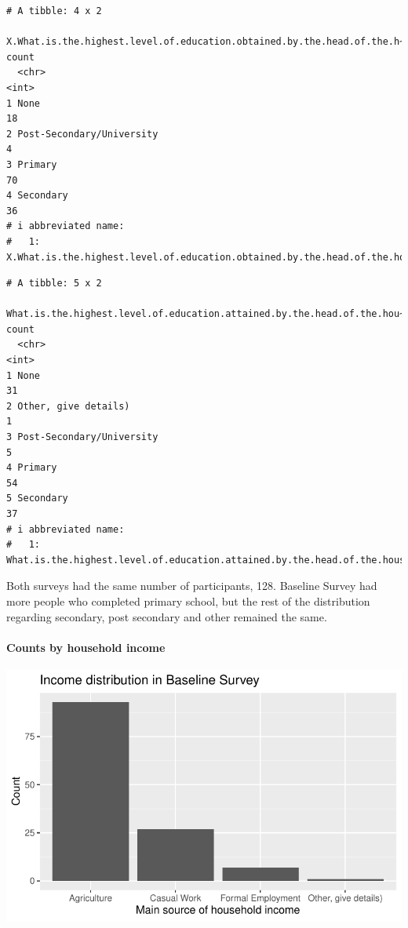 \documentclass[
  letterpaper,
  DIV=11,
  numbers=noendperiod]{scrartcl}
\let\oldparagraph\paragraph
\renewcommand{\paragraph}[1]{\oldparagraph{#1}\mbox{}}
\begin{document}
\begin{verbatim}
# A tibble: 4 x 2
  X.What.is.the.highest.level.of.education.obtained.by.the.head.of.the.h~1 count
  <chr>                                                                    <int>
1 None                                                                        18
2 Post-Secondary/University                                                    4
3 Primary                                                                     70
4 Secondary                                                                   36
# i abbreviated name:
#   1: X.What.is.the.highest.level.of.education.obtained.by.the.head.of.the.household.
\end{verbatim}

\begin{verbatim}
# A tibble: 5 x 2
  What.is.the.highest.level.of.education.attained.by.the.head.of.the.hou~1 count
  <chr>                                                                    <int>
1 None                                                                        31
2 Other, give details)                                                         1
3 Post-Secondary/University                                                    5
4 Primary                                                                     54
5 Secondary                                                                   37
# i abbreviated name:
#   1: What.is.the.highest.level.of.education.attained.by.the.head.of.the.household..
\end{verbatim}

Both surveys had the same number of participants, 128. Baseline Survey
had more people who completed primary school, but the rest of the
distribution regarding secondary, post secondary and other remained the
same.

\hypertarget{counts-by-household-income}{%
\paragraph{Counts by household
income}\label{counts-by-household-income}}

\includegraphics{report_files/figure-pdf/unnamed-chunk-21-1.pdf}
\end{document}
